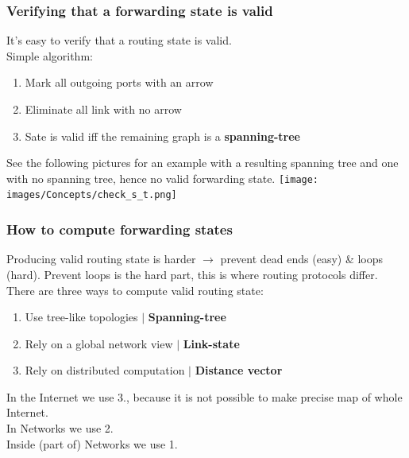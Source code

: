 \documentclass[a4paper, fontsize=8pt, landscape, DIV=1]{scrartcl}
\begin{document}
\begin{multicols*}{4}
			\subsubsection{Verifying that a forwarding state is valid}
			It's easy to verify that a routing state is valid. \\
			Simple algorithm: 
			\vspace{-0.1cm}
			\begin{enumerate}[noitemsep]
				\item Mark all outgoing ports with an arrow
				\item Eliminate all link with no arrow 
				\item Sate is valid iff the remaining graph is a \textbf{spanning-tree}
			\end{enumerate} 
			See the following pictures for an example with a resulting spanning tree and one with no spanning tree, hence no valid forwarding state.
			\texttt{[image: images/Concepts/check\_s\_t.png]}
			 
			\subsubsection{How to compute forwarding states}\label{kap:How to compute forwarding}
			Producing valid routing state is harder $\rightarrow$ prevent dead ends (easy) \& loops (hard). Prevent loops is the hard part, this is where routing protocols differ. There are three ways to compute valid routing state: 
			\begin{enumerate}[noitemsep]
				\item Use tree-like topologies $\vert$ \textbf{Spanning-tree}
			 	\item Rely on a global network view $\vert$ \textbf{Link-state}
			 	\item Rely on distributed computation $\vert$ \textbf{Distance vector} 
		 	\end{enumerate}
			In the Internet we use 3., because it is not possible to make precise map of whole Internet.\\
			In Networks we use 2.\\
			Inside (part of) Networks we use 1. \par
			

\end{multicols*}
\end{document}
